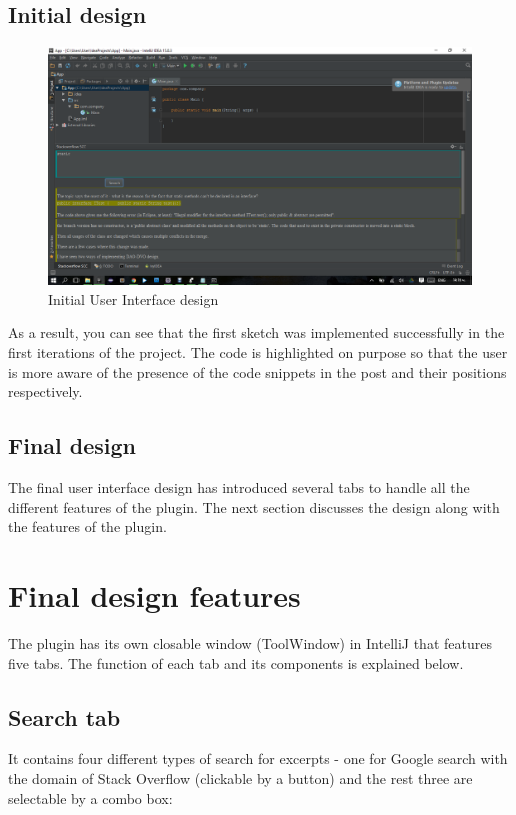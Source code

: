 \documentclass{l4proj}
\begin{document}
\subsection{Initial design}
\begin{figure}[H]
\includegraphics[scale=0.5]{ui-old}
\centering
\caption{Initial User Interface design}\label{ui-old}
\label{fig:ui-old}
\end{figure}

As a result, you can see that the first sketch was implemented successfully in the first iterations of the project. The code is highlighted on purpose so that the user is more aware of the presence of the code snippets in the post and their positions respectively.

\subsection{Final design}
The final user interface design has introduced several tabs to handle all the different features of the plugin. The next section discusses the design along with the features of the plugin.

\section{Final design features}
The plugin has its own closable window (ToolWindow) in IntelliJ that features five tabs. The function of each tab and its components is explained below.

\subsection{Search tab}
It contains four different types of search for excerpts - one for Google search with the domain of Stack Overflow (clickable by a button) and the rest three are selectable by a combo box:
\end{document}
